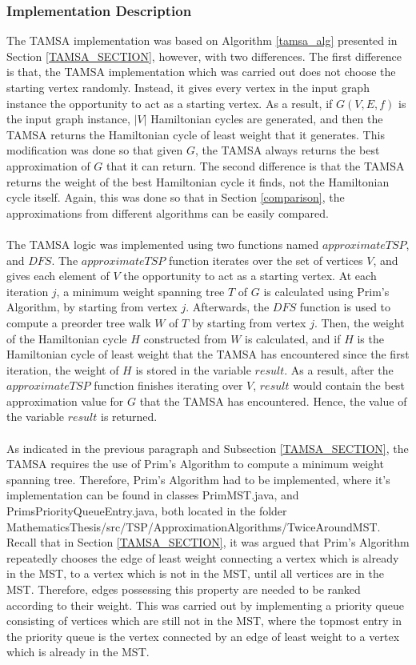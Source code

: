 \documentclass[12pt]{article}
\numberwithin{equation}{subsection}
\numberwithin{table}{subsection}
\numberwithin{algorithm}{subsection}
\numberwithin{figure}{subsection}
\begin{document}
\subsubsection{Implementation Description}
\label{TAMSA_impl}
The TAMSA implementation was based on Algorithm \ref{tamsa_alg} presented in Section \ref{TAMSA_SECTION}, however, with two differences. The first difference is that, the TAMSA implementation which was carried out does not choose the starting vertex randomly. Instead, it gives every vertex in the input graph instance the opportunity to act as a starting vertex. As a result, if $G(V,E,f)$ is the input graph instance, $|V|$ Hamiltonian cycles are generated, and then the TAMSA returns the Hamiltonian cycle of least weight that it generates. This modification was done so that given $G$, the TAMSA always returns the best approximation of $G$ that it can return. The second difference is that the TAMSA returns the weight of the best Hamiltonian cycle it finds, not the Hamiltonian cycle itself. Again, this was done so that in Section \ref{comparison}, the approximations from different algorithms can be easily compared. \\\\
The TAMSA logic was implemented using two functions named $approximateTSP$, and $DFS$. The $approximateTSP$ function iterates over the set of vertices $V$, and gives each element of $V$ the opportunity to act as a starting vertex. At each iteration $j$, a minimum weight spanning tree $T$ of $G$ is calculated using Prim's Algorithm, by starting from vertex $j$. Afterwards, the $DFS$ function is used to compute a preorder tree walk $W$ of $T$ by starting from vertex $j$. Then, the weight of the Hamiltonian cycle $H$ constructed from $W$ is calculated, and if $H$ is the Hamiltonian cycle of least weight that the TAMSA has encountered since the first iteration, the weight of $H$ is stored in the variable $result$. As a result, after the $approximateTSP$ function finishes iterating over $V$, $result$ would contain the best approximation value for $G$ that the TAMSA has encountered. Hence, the value of the variable $result$ is returned.    \\\\
As indicated in the previous paragraph and Subsection \ref{TAMSA_SECTION}, the TAMSA requires the use of Prim's Algorithm to compute a minimum weight spanning tree. Therefore, Prim's Algorithm had to be implemented, where it's implementation can be found in classes PrimMST.java, and PrimsPriorityQueueEntry.java, both located in the folder MathematicsThesis/src/TSP/ApproximationAlgorithms/TwiceAroundMST. Recall that in Section \ref{TAMSA_SECTION}, it was argued that Prim's Algorithm repeatedly chooses the edge of least weight connecting a vertex which is already in the MST, to a vertex which is not in the MST, until all vertices are in the MST. Therefore, edges possessing this property are needed to be ranked according to their weight. This was carried out by implementing a priority queue consisting of vertices which are still not in the MST, where the topmost entry in the priority queue is the vertex connected by an edge of least weight to a vertex which is already in the MST.\\\\
\end{document}
